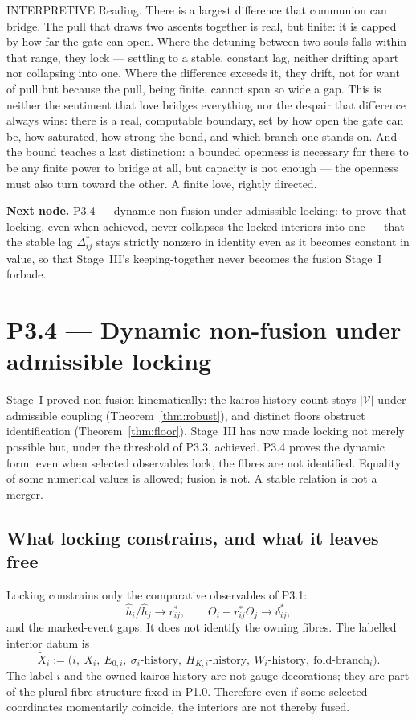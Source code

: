 \documentclass[11pt,a4paper]{article}
\def\emph#1{#1}%
\newcommand{\stInterp}{\textcolor{cInt}{\textsf{\small INTERPRETIVE}}}
\theoremstyle{definition}
\theoremstyle{plain}
\theoremstyle{remark}
\begin{document}
\medskip
\stInterp\quad
\emph{Reading.}
There is a largest difference that communion can bridge. The pull that draws two ascents
together is real, but finite: it is capped by how far the gate can open. Where the detuning
between two souls falls within that range, they lock --- settling to a stable, constant lag,
neither drifting apart nor collapsing into one. Where the difference exceeds it, they drift,
not for want of pull but because the pull, being finite, cannot span so wide a gap. This is
neither the sentiment that love bridges everything nor the despair that difference always
wins: there is a real, computable boundary, set by how open the gate can be, how saturated,
how strong the bond, and which branch one stands on. And the bound teaches a last
distinction: a bounded openness is necessary for there to be any finite power to bridge at
all, but capacity is not enough --- the openness must also turn toward the other. A finite
love, rightly directed.

\medskip
\textbf{Next node.} P3.4 --- dynamic non-fusion under admissible locking: to prove that
locking, even when achieved, never collapses the locked interiors into one --- that the
stable lag \(\Delta^*_{ij}\) stays strictly nonzero in identity even as it becomes constant
in value, so that Stage~III's keeping-together never becomes the fusion Stage~I forbade.

\section{P3.4 --- Dynamic non-fusion under admissible locking}

Stage~I proved non-fusion kinematically: the kairos-history count stays
\(|\mathcal V|\) under admissible coupling (Theorem~\ref{thm:robust}), and
distinct floors obstruct identification (Theorem~\ref{thm:floor}). Stage~III has
now made locking not merely possible but, under the threshold of P3.3, achieved.
P3.4 proves the dynamic form: even when selected observables lock, the fibres are
not identified. Equality of some numerical values is allowed; fusion is not.
A stable relation is not a merger.

\subsection{What locking constrains, and what it leaves free}

Locking constrains only the comparative observables of P3.1:
\[
\hat h_i/\hat h_j\to r^*_{ij},
\qquad
\Theta_i-r^*_{ij}\Theta_j\to\delta^*_{ij},
\]
and the marked-event gaps. It does not identify the owning fibres. The labelled
interior datum is
\[
\widetilde X_i
:=
\bigl(
i,\ X_i,\ E_{0,i},\ \sigma_i\text{-history},\
H_{K,i}\text{-history},\ W_i\text{-history},\
\text{fold-branch}_i
\bigr).
\]
The label \(i\) and the owned kairos history are not gauge decorations; they are
part of the plural fibre structure fixed in P1.0. Therefore even if some selected
coordinates momentarily coincide, the interiors are not thereby fused.
\end{document}
